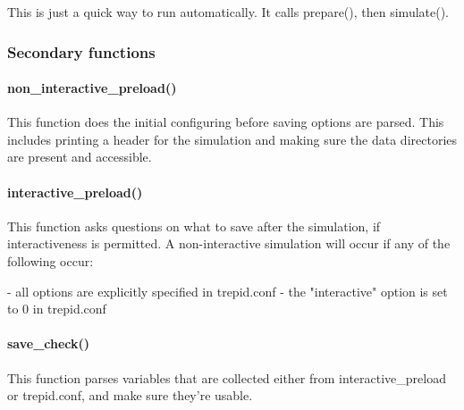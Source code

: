 This is just a quick way to run automatically. It calls prepare(), then
simulate().

\subsubsection*{Secondary functions\label{Secondary_functions}}
\paragraph*{non\_interactive\_preload()\label{non_interactive_preload_}}


This function does the initial configuring before saving options are
parsed. This includes printing a header for the simulation and making
sure the data directories are present and accessible.

\paragraph*{interactive\_preload()\label{interactive_preload_}}


This function asks questions on what to save after the simulation, if
interactiveness is permitted. A non-interactive simulation will occur
if any of the following occur:



- all options are explicitly specified in trepid.conf
- the "interactive" option is set to 0 in trepid.conf

\paragraph*{save\_check()\label{save_check_}}


This function parses variables that are collected either from
interactive\_preload or trepid.conf, and make sure they're usable.

